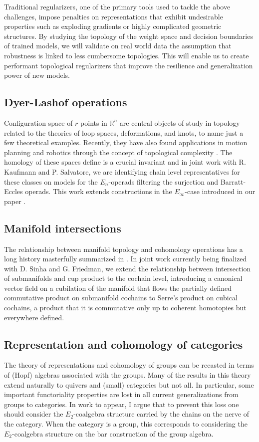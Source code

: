 Traditional regularizers, one of the primary tools used to tackle the above challenges, impose penalties on representations that exhibit undesirable properties such as exploding gradients or highly complicated geometric structures. By studying the topology of the weight space and decision boundaries of trained models, we will validate on real world data the assumption that robustness is linked to less cumbersome topologies. This will enable us to create performant topological regularizers that improve the resilience and generalization power of new models.

\subsection{Dyer-Lashof operations} Configuration space of $r$ points in $\mathbb R^n$ are central objects of study in topology related to the theories of loop spaces, deformations, and knots, to name just a few theoretical examples. Recently, they have also found applications in motion planning and robotics through the concept of topological complexity \cite{farber2003topological, ghrist2010configuration}. The homology of these spaces define is a crucial invariant and in joint work with R. Kaufmann and P. Salvatore, we are identifying chain level representatives for these classes on models for the $E_n$-operads filtering the surjection and Barratt-Eccles operads. This work extends constructions in the $E_\infty$-case introduced in our paper \cite{medina2020maysteenrod}.

\subsection{Manifold intersections} The relationship between manifold topology and cohomology operations has a long history  masterfully summarized in \cite{milnor2016characteristic}. In joint work currently being finalized with D. Sinha and G. Friedman, we extend the relationship between intersection of submanifolds and cup product to the cochain level, introducing a canonical vector field on a cubilation of the manifold that flows the partially defined commutative product on submanifold cochains to Serre's product on cubical cochains, a product that it is commutative only up to coherent homotopies but everywhere defined.

\subsection{Representation and cohomology of categories} The theory of representations and cohomology of groups can be recasted in terms of (Hopf) algebras associated with the groups. Many of the results in this theory extend naturally to quivers and (small) categories but not all. In particular, some important functoriality properties are lost in all current generalizations from groups to categories. In work to appear, I argue that to prevent this loss one should consider the $E_2$-coalgebra structure carried by the chains on the nerve of the category. When the category is a group, this corresponds to considering the $E_2$-coalgebra structure on the bar construction of the group algebra.

